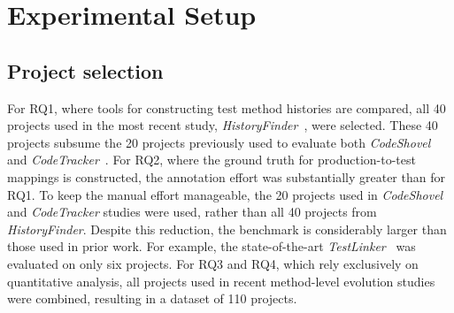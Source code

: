 \section{Experimental Setup}
\label{setup}
\subsection{Project selection}
For RQ1, where tools for constructing test method histories are compared, all 40 projects used in the most recent study, \emph{HistoryFinder}~\cite{islam_historyfinder_2025}, were selected. These 40 projects subsume the 20 projects previously used to evaluate both \emph{CodeShovel}~\cite{grund:2021} and \emph{CodeTracker}~\cite{jodavi_accurate_2022}. For RQ2, where the ground truth for production-to-test mappings is constructed, the annotation effort was substantially greater than for RQ1. To keep the manual effort manageable, the 20 projects used in \emph{CodeShovel} and \emph{CodeTracker} studies were used, rather than all 40 projects from \emph{HistoryFinder}. Despite this reduction, the benchmark is considerably larger than those used in prior work. For example, the state-of-the-art \emph{TestLinker}~\cite{sun_method-level_2024} was evaluated on only six projects. For RQ3 and RQ4, which rely exclusively on quantitative analysis, all projects used in recent method-level evolution studies~\cite{grund:2021,islam_historyfinder_2025,chowdhury2024method,friesen_repeat_2025} were combined, resulting in a dataset of 110 projects.


